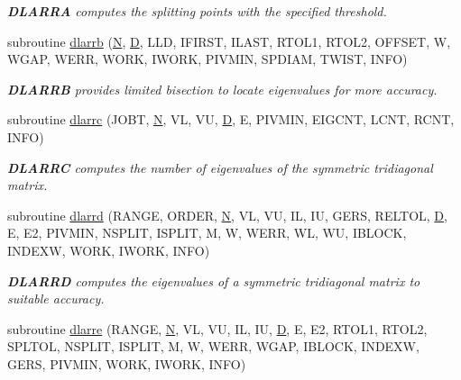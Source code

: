 \begin{DoxyCompactItemize}
\begin{DoxyCompactList}\small\item\em {\bfseries D\+L\+A\+R\+R\+A} computes the splitting points with the specified threshold. \end{DoxyCompactList}\item 
subroutine \hyperlink{group__auxOTHERauxiliary_gab3446b2d3189e23e5b95f18ea97b0a22}{dlarrb} (\hyperlink{polmisc_8c_a0240ac851181b84ac374872dc5434ee4}{N}, \hyperlink{odrpack_8h_a7dae6ea403d00f3687f24a874e67d139}{D}, L\+L\+D, I\+F\+I\+R\+S\+T, I\+L\+A\+S\+T, R\+T\+O\+L1, R\+T\+O\+L2, O\+F\+F\+S\+E\+T, W, W\+G\+A\+P, W\+E\+R\+R, W\+O\+R\+K, I\+W\+O\+R\+K, P\+I\+V\+M\+I\+N, S\+P\+D\+I\+A\+M, T\+W\+I\+S\+T, I\+N\+F\+O)
\begin{DoxyCompactList}\small\item\em {\bfseries D\+L\+A\+R\+R\+B} provides limited bisection to locate eigenvalues for more accuracy. \end{DoxyCompactList}\item 
subroutine \hyperlink{group__auxOTHERauxiliary_gac6a65096bc8be9a4dc881a96147075ea}{dlarrc} (J\+O\+B\+T, \hyperlink{polmisc_8c_a0240ac851181b84ac374872dc5434ee4}{N}, V\+L, V\+U, \hyperlink{odrpack_8h_a7dae6ea403d00f3687f24a874e67d139}{D}, E, P\+I\+V\+M\+I\+N, E\+I\+G\+C\+N\+T, L\+C\+N\+T, R\+C\+N\+T, I\+N\+F\+O)
\begin{DoxyCompactList}\small\item\em {\bfseries D\+L\+A\+R\+R\+C} computes the number of eigenvalues of the symmetric tridiagonal matrix. \end{DoxyCompactList}\item 
subroutine \hyperlink{group__auxOTHERauxiliary_gaa9fa3671522ed0e21695769fd85982c7}{dlarrd} (R\+A\+N\+G\+E, O\+R\+D\+E\+R, \hyperlink{polmisc_8c_a0240ac851181b84ac374872dc5434ee4}{N}, V\+L, V\+U, I\+L, I\+U, G\+E\+R\+S, R\+E\+L\+T\+O\+L, \hyperlink{odrpack_8h_a7dae6ea403d00f3687f24a874e67d139}{D}, E, E2, P\+I\+V\+M\+I\+N, N\+S\+P\+L\+I\+T, I\+S\+P\+L\+I\+T, M, W, W\+E\+R\+R, W\+L, W\+U, I\+B\+L\+O\+C\+K, I\+N\+D\+E\+X\+W, W\+O\+R\+K, I\+W\+O\+R\+K, I\+N\+F\+O)
\begin{DoxyCompactList}\small\item\em {\bfseries D\+L\+A\+R\+R\+D} computes the eigenvalues of a symmetric tridiagonal matrix to suitable accuracy. \end{DoxyCompactList}\item 
subroutine \hyperlink{group__auxOTHERauxiliary_gae8358ae1847bb9cfb96b56b6f3ef6386}{dlarre} (R\+A\+N\+G\+E, \hyperlink{polmisc_8c_a0240ac851181b84ac374872dc5434ee4}{N}, V\+L, V\+U, I\+L, I\+U, \hyperlink{odrpack_8h_a7dae6ea403d00f3687f24a874e67d139}{D}, E, E2, R\+T\+O\+L1, R\+T\+O\+L2, S\+P\+L\+T\+O\+L, N\+S\+P\+L\+I\+T, I\+S\+P\+L\+I\+T, M, W, W\+E\+R\+R, W\+G\+A\+P, I\+B\+L\+O\+C\+K, I\+N\+D\+E\+X\+W, G\+E\+R\+S, P\+I\+V\+M\+I\+N, W\+O\+R\+K, I\+W\+O\+R\+K, I\+N\+F\+O)

\end{DoxyCompactItemize}
